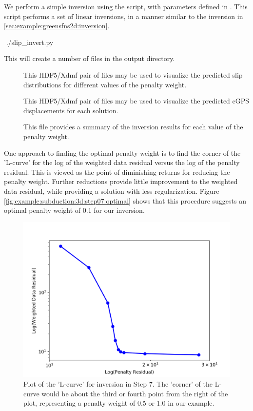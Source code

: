We perform a simple inversion using the  script,
with parameters defined in . This script
performs a set of linear inversions, in a manner similar to the
inversion in \vref{sec:example:greensfns2d:inversion}. 
\begin{shell}
$$ ./slip_invert.py
\end{shell}
This will create a number of files in the output directory.
\begin{description}
\item[] This HDF5/Xdmf pair of files
  may be used to visualize the predicted slip distributions for
  different values of the penalty weight.
\item[] This HDF5/Xdmf pair
  of files may be used to visualize the predicted cGPS displacements
  for each solution.
\item[] This file provides a summary
  of the inversion results for each value of the penalty weight.
\end{description}

One approach to finding the optimal penalty weight is to find the
corner of the 'L-curve' for the log of the weighted data residual
versus the log of the penalty residual. This is viewed as the point of
diminishing returns for reducing the penalty weight. Further
reductions provide little improvement to the weighted data residual,
while providing a solution with less regularization. Figure
\vref{fig:example:subduction:3d:step07:optimal} shows that this
procedure suggests an optimal penalty weight of 0.1 for our inversion.

\begin{figure}
  \includegraphics[width=4.5in]{examples/figs/subduction3d_step07_inverse_curve}
  \caption{Plot of the 'L-curve' for inversion in Step 7. The
    'corner' of the L-curve would be about the third or fourth point
    from the right of the plot, representing a penalty weight of 0.5
    or 1.0 in our example. }
  \label{fig:example:subduction:3d:step07:optimal}
\end{figure}

